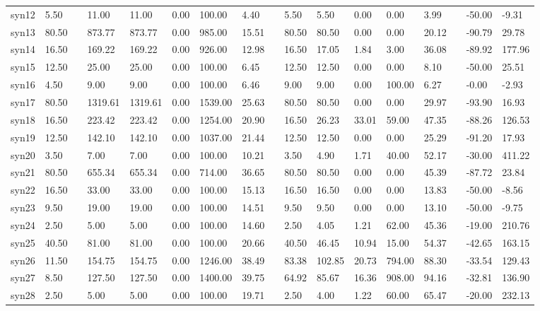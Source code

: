 \begin{table}[H]
\begin{tabularx}{\textwidth}{XXlXXXXXlXXXXXlXX}
    syn12 & 5.50 && 11.00 & 11.00 & 0.00 & 100.00 & 4.40 && 5.50 & 5.50 & 0.00 & 0.00 & 3.99 && -50.00 & -9.31\\
    syn13 & 80.50 && 873.77 & 873.77 & 0.00 & 985.00 & 15.51 && 80.50 & 80.50 & 0.00 & 0.00 & 20.12 && -90.79 & 29.78\\
    syn14 & 16.50 && 169.22 & 169.22 & 0.00 & 926.00 & 12.98 && 16.50 & 17.05 & 1.84 & 3.00 & 36.08 && -89.92 & 177.96\\
    syn15 & 12.50 && 25.00 & 25.00 & 0.00 & 100.00 & 6.45 && 12.50 & 12.50 & 0.00 & 0.00 & 8.10 && -50.00 & 25.51\\
    syn16 & 4.50 && 9.00 & 9.00 & 0.00 & 100.00 & 6.46 && 9.00 & 9.00 & 0.00 & 100.00 & 6.27 && -0.00 & -2.93\\
    syn17 & 80.50 && 1319.61 & 1319.61 & 0.00 & 1539.00 & 25.63 && 80.50 & 80.50 & 0.00 & 0.00 & 29.97 && -93.90 & 16.93\\
    syn18 & 16.50 && 223.42 & 223.42 & 0.00 & 1254.00 & 20.90 && 16.50 & 26.23 & 33.01 & 59.00 & 47.35 && -88.26 & 126.53\\
    syn19 & 12.50 && 142.10 & 142.10 & 0.00 & 1037.00 & 21.44 && 12.50 & 12.50 & 0.00 & 0.00 & 25.29 && -91.20 & 17.93\\
    syn20 & 3.50 && 7.00 & 7.00 & 0.00 & 100.00 & 10.21 && 3.50 & 4.90 & 1.71 & 40.00 & 52.17 && -30.00 & 411.22\\
    syn21 & 80.50 && 655.34 & 655.34 & 0.00 & 714.00 & 36.65 && 80.50 & 80.50 & 0.00 & 0.00 & 45.39 && -87.72 & 23.84\\
    syn22 & 16.50 && 33.00 & 33.00 & 0.00 & 100.00 & 15.13 && 16.50 & 16.50 & 0.00 & 0.00 & 13.83 && -50.00 & -8.56\\
    syn23 & 9.50 && 19.00 & 19.00 & 0.00 & 100.00 & 14.51 && 9.50 & 9.50 & 0.00 & 0.00 & 13.10 && -50.00 & -9.75\\
    syn24 & 2.50 && 5.00 & 5.00 & 0.00 & 100.00 & 14.60 && 2.50 & 4.05 & 1.21 & 62.00 & 45.36 && -19.00 & 210.76\\
    syn25 & 40.50 && 81.00 & 81.00 & 0.00 & 100.00 & 20.66 && 40.50 & 46.45 & 10.94 & 15.00 & 54.37 && -42.65 & 163.15\\
    syn26 & 11.50 && 154.75 & 154.75 & 0.00 & 1246.00 & 38.49 && 83.38 & 102.85 & 20.73 & 794.00 & 88.30 && -33.54 & 129.43\\
    syn27 & 8.50 && 127.50 & 127.50 & 0.00 & 1400.00 & 39.75 && 64.92 & 85.67 & 16.36 & 908.00 & 94.16 && -32.81 & 136.90\\
    syn28 & 2.50 && 5.00 & 5.00 & 0.00 & 100.00 & 19.71 && 2.50 & 4.00 & 1.22 & 60.00 & 65.47 && -20.00 & 232.13\\

\end{tabularx}
\end{table}
